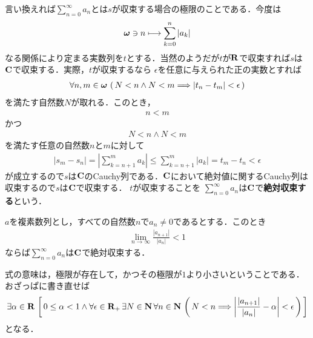 	言い換えれば$\sum_{n=0}^\infty a_n$とは$s$が収束する場合の極限のことである．今度は
	\begin{align}
		{\boldsymbol \omega} \ni n \longmapsto \sum_{k=0}^n |a_k|
	\end{align}
	なる関係により定まる実数列を$t$とする．当然のようだが$t$が$\mathbf{R}$で収束すれば$s$は$\mathbf{C}$で収束する．実際，$t$が収束するなら
	$\epsilon$を任意に与えられた正の実数とすれば
	\begin{align}
		\forall n,m \in {\boldsymbol \omega}\, \left(\, N < n \wedge N < m \Longrightarrow 
		|t_n - t_m| < \epsilon\, \right)
	\end{align}
	を満たす自然数$N$が取れる．このとき，
	\begin{align}
		n < m
	\end{align}
	かつ
	\begin{align}
		N < n \wedge N < m
	\end{align}
	を満たす任意の自然数$n$と$m$に対して
	\begin{align}
		|s_m - s_n| = \left|\sum_{k=n+1}^m a_k\right| \leq \sum_{k=n+1}^m |a_k| = t_m - t_n < \epsilon
	\end{align}
	が成立するので$s$は$\mathbf{C}$のCauchy列である．$\mathbf{C}$において絶対値に関するCauchy列は収束するので$s$は$\mathbf{C}$で収束する．
	$t$が収束することを
	$\sum_{n=0}^\infty a_n$は$\mathbf{C}$で{\bf 絶対収束する}という．
	
	\begin{screen}
		\begin{thm}[d'Alembertの収束判定法]
			$a$を複素数列とし，すべての自然数$n$で$a_n \neq 0$であるとする．このとき
			\begin{align}
				\lim_{n \to \infty} \frac{|a_{n+1}|}{|a_n|} < 1
			\end{align}
			ならば$\sum_{n=0}^\infty a_n$は$\mathbf{C}$で絶対収束する．
		\end{thm}
	\end{screen}
	
	式の意味は，極限が存在して，かつその極限が$1$より小さいということである．おざっぱに書き直せば
	\begin{align}
		\exists \alpha \in \mathbf{R}\, \left[\, 
		0 \leq \alpha < 1 \wedge \forall \epsilon \in \mathbf{R}_+\, \exists N \in \mathbf{N}\, \forall n \in \mathbf{N}\,
		\left(\, N < n \Longrightarrow \left|\frac{|a_{n+1}|}{|a_n|} - \alpha\right| < \epsilon\, \right)\, \right]
	\end{align}
	となる．
	
	\begin{sketch}
		
	\end{sketch}
	
